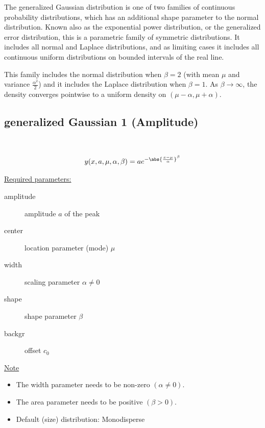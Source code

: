 The generalized Gaussian distribution is one of two families of
continuous probability distributions, which has an additional shape
parameter to the normal distribution. Known also as the exponential
power distribution, or the generalized error distribution, this is a
parametric family of symmetric distributions. It includes all normal
and Laplace distributions, and as limiting cases it includes all
continuous uniform distributions on bounded intervals of the real
line.

This family includes the normal distribution when $\beta=2$ (with
mean $\mu$ and variance $\frac{\alpha^2}{2}$) and it includes the
Laplace distribution when $\beta=1$. As $\beta\rightarrow\infty$,
the density converges pointwise to a uniform density on $
(\mu-\alpha,\mu+\alpha)$.

\clearpage
\subsection{generalized Gaussian 1 (Amplitude)} ~\\
\label{sec:generalizedGaussian1Amplitude}

\begin{align}
y(x,a,\mu,\alpha,\beta) = a e^{-\abs{\frac{x-\mu}{\alpha}}^\beta}
\end{align}

\uline{Required parameters:}
\begin{description}
    \item[amplitude] amplitude $a$ of the peak
    \item[center] location parameter (mode) $\mu$
    \item[width] scaling parameter $\alpha \neq 0$
    \item[shape] shape parameter $\beta$
    \item[backgr] offset $c_0$
\end{description}

\uline{Note}
\begin{itemize}
  \item The width parameter needs to be non-zero $(\alpha\neq 0)$.
  \item The area parameter needs to be positive $(\beta> 0)$.
  \item Default (size) distribution: Monodisperse
\end{itemize}

